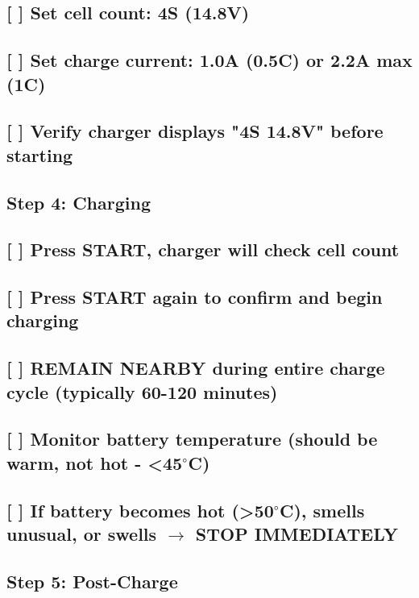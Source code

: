 \documentclass[11pt,letterpaper]{article}
\begin{document}
\subsection*{[ ] Set cell count: 4S (14.8V)}

\subsection*{[ ] Set charge current: 1.0A (0.5C) or 2.2A max (1C)}

\subsection*{[ ] Verify charger displays "4S 14.8V" before starting}

\subsection*{Step 4: Charging}

\subsection*{[ ] Press START, charger will check cell count}

\subsection*{[ ] Press START again to confirm and begin charging}

\subsection*{[ ] REMAIN NEARBY during entire charge cycle (typically 60-120 minutes)}

\subsection*{[ ] Monitor battery temperature (should be warm, not hot - <45$^\circ$C)}

\subsection*{[ ] If battery becomes hot (>50$^\circ$C), smells unusual, or swells $\rightarrow$ STOP IMMEDIATELY}

\subsection*{Step 5: Post-Charge}
\end{document}
